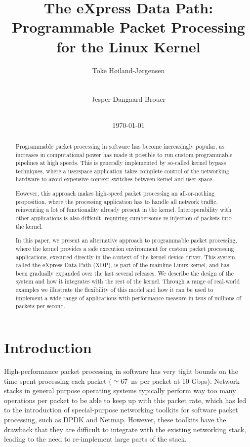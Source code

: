 \documentclass[10pt]{sig-alternate-05-2015}
\author{
\alignauthor
Toke Høiland-Jørgensen\\
       \affaddr{Dept of Computer Science}\\
       \affaddr{Karlstad University, Sweden}\\
       \email{toke.hoiland-jorgensen@kau.se}
\alignauthor
Jesper Dangaard Brouer\\
       \affaddr{Red Hat}\\
       \email{brouer@redhat.com}}
\date{\today}
\title{The eXpress Data Path: Programmable Packet Processing for the Linux Kernel}
\begin{document}

\maketitle

\begin{abstract}
  Programmable packet processing in software has become increasingly popular, as
  increases in computational power has made it possible to run custom
  programmable pipelines at high speeds. This is generally implemented by
  so-called kernel bypass techniques, where a userspace application takes
  complete control of the networking hardware to avoid expensive context
  switches between kernel and user space.

  However, this approach makes high-speed packet processing an all-or-nothing
  proposition, where the processing application has to handle all network
  traffic, reinventing a lot of functionality already present in the kernel.
  Interoperability with other applications is also difficult, requiring
  cumbersome re-injection of packets into the kernel.

  In this paper, we present an alternative approach to programmable packet
  processing, where the kernel provides a safe execution environment for custom
  packet processing applications, executed directly in the context of the kernel
  device driver. This system, called the eXpress Data Path (XDP), is part of the
  mainline Linux kernel, and has been gradually expanded over the last several
  releases. We describe the design of the system and how it integrates with the
  rest of the kernel. Through a range of real-world examples we illustrate the
  flexibility of this model and how it can be used to implement a wide range of
  applications with performance measure in tens of millions of packets per
  second.
\end{abstract}

\section{Introduction}
\label{sec:introduction}
High-performance packet processing in software has very tight bounds on the time
spent processing each packet ($\simeq67$~ns per packet at 10 Gbps). Network
stacks in general purpose operating systems typically perform way too many
operations per packet to be able to keep up with this packet rate, which has led
to the introduction of special-purpose networking toolkits for software packet
processing, such as DPDK and Netmap. However, these toolkits have the drawback
that they are difficult to integrate with the existing networking stack, leading
to the need to re-implement large parts of the stack.
\end{document}
